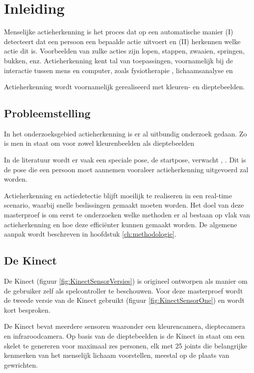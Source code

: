 \setcounter{page}{1}
\chapter{Inleiding}
\label{ch:Inleiding}
Menselijke actieherkenning is het proces dat op een automatische manier (I) detecteert dat een persoon een bepaalde actie uitvoert en (II) herkennen welke actie dit is. Voorbeelden van zulke acties zijn lopen, stappen, zwaaien, springen, bukken, enz. Actieherkenning kent tal van toepassingen, voornamelijk bij de interactie tussen mens en computer, zoals fysiotherapie \cite{Deboeverie2016}, lichaamsanalyse \cite{Devi2015} en 

Actieherkenning wordt voornamelijk gerealiseerd met kleuren- en dieptebeelden.







\section{Probleemstelling}
In het onderzoeksgebied actieherkenning is er al uitbundig onderzoek gedaan. Zo is men in staat om voor zowel kleurenbeelden als dieptebeelden 

In de literatuur wordt er vaak een speciale pose, de startpose, verwacht \cite{Zhu2013}, \cite{Deboeverie2016}. Dit is de pose die een persoon moet aannemen vooraleer actieherkenning uitgevoerd zal worden.

Actieherkenning en actiedetectie blijft moeilijk te realiseren in een real-time scenario, waarbij snelle beslissingen gemaakt moeten worden. Het doel van deze masterproef is om eerst te onderzoeken welke methoden er al bestaan op vlak van actieherkenning en hoe deze efficiënter kunnen gemaakt worden. De algemene aanpak wordt beschreven in hoofdstuk \ref{ch:methodologie}.



\section{De Kinect}
De Kinect (figuur \ref{fig:KinectSensorVersies}) is origineel ontworpen als manier om de gebruiker zelf als spelcontroller te beschouwen. Voor deze masterproef wordt de tweede versie van de Kinect gebruikt (figuur \ref{fig:KinectSensorOne}) en wordt kort besproken.

De Kinect bevat meerdere sensoren waaronder een kleurencamera, dieptecamera en infraroodcamera. Op basis van de dieptebeelden is de Kinect in staat om een skelet te genereren voor maximaal zes personen, elk met 25 joints die belangrijke kenmerken van het menselijk lichaam voorstellen, meestal op de plaats van gewrichten.



